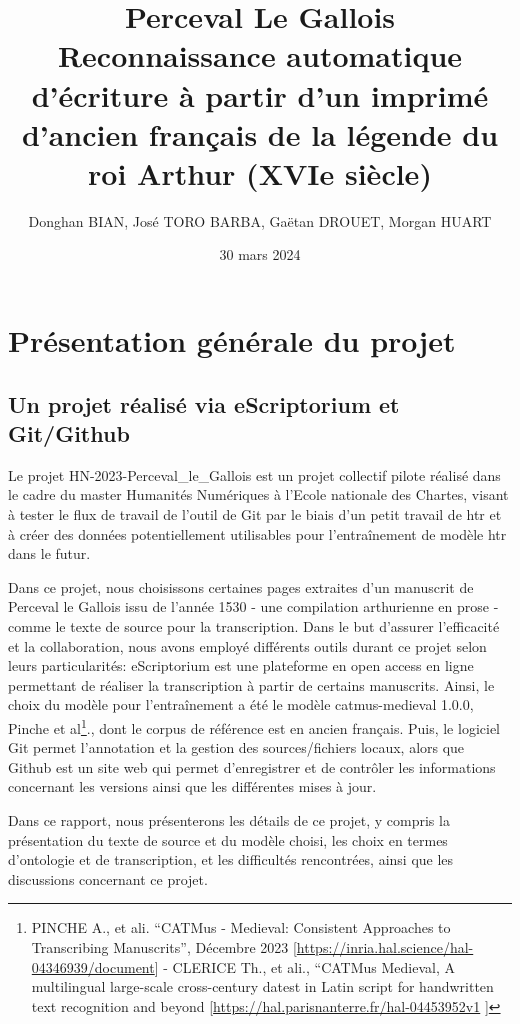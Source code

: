 \documentclass[12pt]{article}
\title{Perceval Le Gallois \\ Reconnaissance automatique d’écriture à partir d’un imprimé d’ancien français de la légende du roi Arthur (XVIe siècle)}
\author{Donghan BIAN, José TORO BARBA, Gaëtan DROUET, Morgan HUART}
\date{30 mars 2024}
\begin{document}
\maketitle


\section{Présentation générale du projet}
\subsection{Un projet réalisé via eScriptorium et Git/Github}

Le projet HN-2023-Perceval\_le\_Gallois est un projet collectif pilote réalisé dans le cadre du master Humanités Numériques à l’Ecole nationale des Chartes, visant à tester le flux de travail de l’outil de Git par le biais d’un petit travail de \acrfull{htr} et à créer des données potentiellement utilisables pour l'entraînement de modèle \acrshort{htr} dans le futur. 

Dans ce projet, nous choisissons certaines pages extraites d’un manuscrit de Perceval le Gallois issu de l’année 1530 - une compilation arthurienne en prose - comme le texte de source pour la transcription. Dans le but d’assurer l’efficacité et la collaboration, nous avons employé différents outils durant ce projet selon leurs particularités: eScriptorium est une plateforme en open access en ligne permettant de réaliser la transcription à partir de certains manuscrits. Ainsi, le choix du modèle pour l’entraînement a été le modèle \acrshort{catmus-medieval} 1.0.0, Pinche et al\footnote{PINCHE A., et ali. “CATMus - Medieval: Consistent Approaches to Transcribing Manuscrits”, Décembre 2023 [\href{https://inria.hal.science/hal-04346939/document}{https://inria.hal.science/hal-04346939/document}] - CLERICE Th., et ali., “CATMus Medieval, A multilingual large-scale cross-century datest in Latin script for handwritten text recognition and beyond [\href{https://hal.parisnanterre.fr/hal-04453952v1}{https://hal.parisnanterre.fr/hal-04453952v1} ]}., dont le corpus de référence est en ancien français. Puis, le logiciel Git permet l’annotation et la gestion des sources/fichiers locaux, alors que Github est un site web qui permet d’enregistrer et de contrôler les informations concernant les versions ainsi que les différentes mises à jour. 

Dans ce rapport, nous présenterons les détails de ce projet, y compris la présentation du texte de source et du modèle choisi, les choix en termes d’ontologie et de transcription, et les difficultés rencontrées, ainsi que les discussions concernant ce projet.
\end{document}
